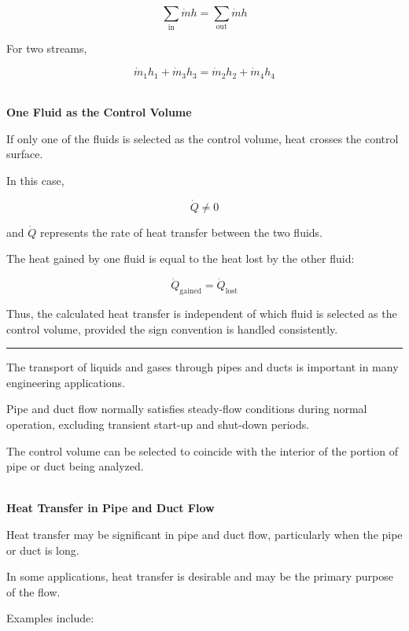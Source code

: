 \documentclass[12pt]{article}
\newcommand{\mysubsection}[2]{%
    \vspace{5px}
    \noindent{\headingfont\large #1\space #2\par}
    \vspace{4pt}
    \hrule
    \vspace{15pt}
}
\begin{document}
\begin{equation*}
\sum_{\mathrm{in}}\dot{m}h
=
\sum_{\mathrm{out}}\dot{m}h
\end{equation*}

For two streams,

\begin{equation*}
\dot{m}_1h_1+\dot{m}_3h_3
=
\dot{m}_2h_2+\dot{m}_4h_4
\end{equation*}

\textbf{\\ One Fluid as the Control Volume}

If only one of the fluids is selected as the control volume, heat crosses the control surface.

In this case,

\begin{equation*}
\dot{Q}\neq0
\end{equation*}

and $\dot{Q}$ represents the rate of heat transfer between the two fluids.

The heat gained by one fluid is equal to the heat lost by the other fluid:

\begin{equation*}
\dot{Q}_{\mathrm{gained}}
=
\dot{Q}_{\mathrm{lost}}
\end{equation*}

Thus, the calculated heat transfer is independent of which fluid is selected as the control volume, provided the sign convention is handled consistently.

\mysubsection{}{Pipe and Duct Flow}

The transport of liquids and gases through pipes and ducts is important in many engineering applications.

Pipe and duct flow normally satisfies steady-flow conditions during normal operation, excluding transient start-up and shut-down periods.

The control volume can be selected to coincide with the interior of the portion of pipe or duct being analyzed.

\textbf{\\ Heat Transfer in Pipe and Duct Flow}

Heat transfer may be significant in pipe and duct flow, particularly when the pipe or duct is long.

In some applications, heat transfer is desirable and may be the primary purpose of the flow.

Examples include:
\end{document}
